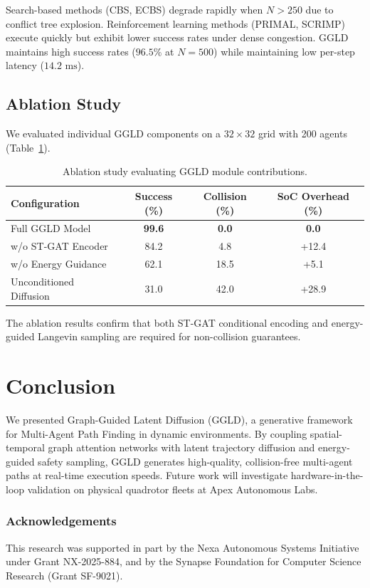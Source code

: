 \documentclass[runningheads]{llncs}
\begin{document}
Search-based methods (CBS, ECBS) degrade rapidly when $N > 250$ due to conflict tree explosion. Reinforcement learning methods (PRIMAL, SCRIMP) execute quickly but exhibit lower success rates under dense congestion. GGLD maintains high success rates ($96.5\%$ at $N=500$) while maintaining low per-step latency ($14.2\text{~ms}$).

\subsection{Ablation Study}
We evaluated individual GGLD components on a $32 \times 32$ grid with 200 agents (Table~\ref{tab:ablation}).

\begin{table}[t]
\caption{Ablation study evaluating GGLD module contributions.}
\label{tab:ablation}
\centering
\small
\setlength{\tabcolsep}{6pt}
\begin{tabular}{@{}l ccc@{}}
\toprule
\textbf{Configuration} & \textbf{Success (\%)} & \textbf{Collision (\%)} & \textbf{SoC Overhead (\%)} \\
\midrule
Full GGLD Model & \textbf{99.6} & \textbf{0.0} & \textbf{0.0} \\
w/o ST-GAT Encoder & 84.2 & 4.8 & +12.4 \\
w/o Energy Guidance & 62.1 & 18.5 & +5.1 \\
Unconditioned Diffusion & 31.0 & 42.0 & +28.9 \\
\bottomrule
\end{tabular}
\end{table}

The ablation results confirm that both ST-GAT conditional encoding and energy-guided Langevin sampling are required for non-collision guarantees.

\section{Conclusion}
We presented Graph-Guided Latent Diffusion (GGLD), a generative framework for Multi-Agent Path Finding in dynamic environments. By coupling spatial-temporal graph attention networks with latent trajectory diffusion and energy-guided safety sampling, GGLD generates high-quality, collision-free multi-agent paths at real-time execution speeds. Future work will investigate hardware-in-the-loop validation on physical quadrotor fleets at Apex Autonomous Labs.

\subsubsection*{Acknowledgements}
This research was supported in part by the Nexa Autonomous Systems Initiative under Grant NX-2025-884, and by the Synapse Foundation for Computer Science Research (Grant SF-9021).
\end{document}
